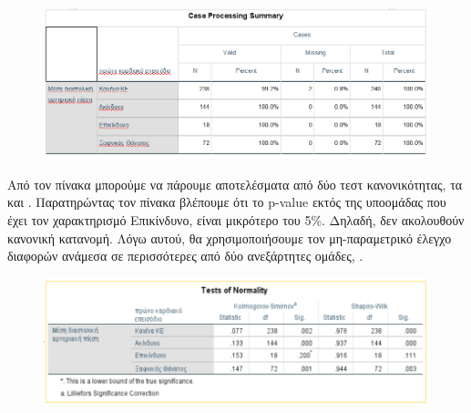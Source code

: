 \begin{figure}[h]
    \centering
    \includegraphics[width=\textwidth]{images/125.PNG}
\end{figure}
\vspace{1cm}
Από τον πίνακα \textbf{} μπορούμε να πάρουμε αποτελέσματα από δύο τεστ κανονικότητας, τα  και . Παρατηρώντας τον πίνακα βλέπουμε ότι το p-value εκτός της υποομάδας που έχει τον χαρακτηρισμό Επικίνδυνο, είναι μικρότερο του 5\%. Δηλαδή, δεν ακολουθούν κανονική κατανομή.  Λόγω αυτού, θα  χρησιμοποιήσουμε τον μη-παραμετρικό έλεγχο διαφορών ανάμεσα σε περισσότερες από δύο ανεξάρτητες ομάδες, . 
\vspace{1cm}
\begin{figure}[h]
    \centering
    \includegraphics[width=\textwidth]{images/126.PNG}
\end{figure}

\clearpage


